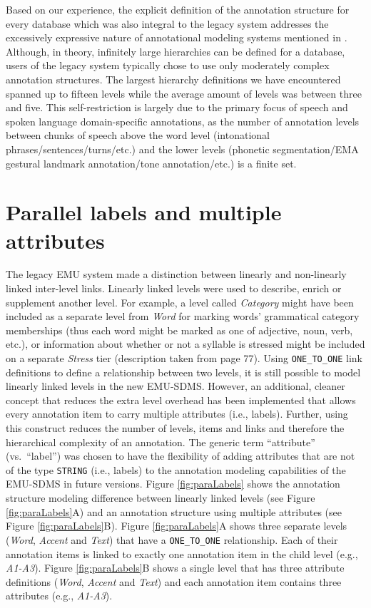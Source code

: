 \documentclass[]{book}
\begin{document}
Based on our experience, the explicit definition of the annotation structure for every database which was also integral to the legacy system addresses the excessively expressive nature of annotational modeling systems mentioned in \citet{bird:sc2001a}. Although, in theory, infinitely large hierarchies can be defined for a database, users of the legacy system typically chose to use only moderately complex annotation structures. The largest hierarchy definitions we have encountered spanned up to fifteen levels while the average amount of levels was between three and five. This self-restriction is largely due to the primary focus of speech and spoken language domain-specific annotations, as the number of annotation levels between chunks of speech above the word level (intonational phrases/sentences/turns/etc.) and the lower levels (phonetic segmentation/EMA gestural landmark annotation/tone annotation/etc.) is a finite set.

\hypertarget{parallel-labels-and-multiple-attributes}{%
\section{Parallel labels and multiple attributes}\label{parallel-labels-and-multiple-attributes}}

The legacy EMU system made a distinction between linearly and non-linearly linked inter-level links. Linearly linked levels were used to describe, enrich or supplement another level. For example, a level called \emph{Category} might have been included as a separate level from \emph{Word} for marking words' grammatical category memberships (thus each word might be marked as one of adjective, noun, verb, etc.), or information about whether or not a syllable is stressed might be included on a separate \emph{Stress} tier (description taken from \citet{harrington:2010a} page 77). Using \texttt{ONE\_TO\_ONE} link definitions to define a relationship between two levels, it is still possible to model linearly linked levels in the new EMU-SDMS. However, an additional, cleaner concept that reduces the extra level overhead has been implemented that allows every annotation item to carry multiple attributes (i.e., labels). Further, using this construct reduces the number of levels, items and links and therefore the hierarchical complexity of an annotation. The generic term ``attribute'' (vs.~``label'') was chosen to have the flexibility of adding attributes that are not of the type \texttt{STRING} (i.e., labels) to the annotation modeling capabilities of the EMU-SDMS in future versions. Figure \ref{fig:paraLabels} shows the annotation structure modeling difference between linearly linked levels (see Figure \ref{fig:paraLabels}A) and an annotation structure using multiple attributes (see Figure \ref{fig:paraLabels}B). Figure \ref{fig:paraLabels}A shows three separate levels (\emph{Word}, \emph{Accent} and \emph{Text}) that have a \texttt{ONE\_TO\_ONE} relationship. Each of their annotation items is linked to exactly one annotation item in the child level (e.g., \emph{A1-A3}). Figure \ref{fig:paraLabels}B shows a single level that has three attribute definitions (\emph{Word}, \emph{Accent} and \emph{Text}) and each annotation item contains three attributes (e.g., \emph{A1-A3}).
\end{document}
